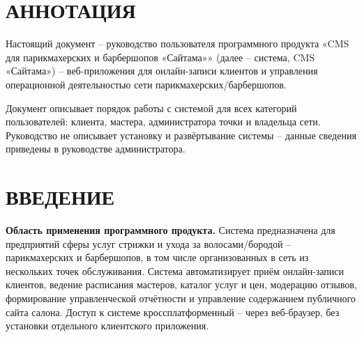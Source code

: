 




\setcounter{page}{2}

\section*{\hspace*{\gostindent}АННОТАЦИЯ}

Настоящий документ -- руководство пользователя программного продукта
«CMS для парикмахерских и барбершопов «Сайтама»» (далее -- система,
CMS «Сайтама») -- веб-приложения для онлайн-записи клиентов и управления
операционной деятельностью сети парикмахерских/барбершопов.

Документ описывает порядок работы с системой для всех категорий
пользователей: клиента, мастера, администратора точки и владельца сети.
Руководство не описывает установку и развёртывание системы --
данные сведения приведены в руководстве администратора.

\newpage
\renewcommand{\contentsname}{СОДЕРЖАНИЕ}
\begingroup
\titleformat{\section}{\bfseries\centering}{\thesection}{0.5em}{}
\tableofcontents
\endgroup
\newpage

\section*{\hspace*{\gostindent}ВВЕДЕНИЕ}

\textbf{Область применения программного продукта.} Система предназначена
для предприятий сферы услуг стрижки и ухода за волосами/бородой --
парикмахерских и барбершопов, в том числе организованных в сеть из
нескольких точек обслуживания. Система автоматизирует приём онлайн-записи
клиентов, ведение расписания мастеров, каталог услуг и цен, модерацию
отзывов, формирование управленческой отчётности и управление содержанием
публичного сайта салона. Доступ к системе кроссплатформенный -- через
веб-браузер, без установки отдельного клиентского приложения.


